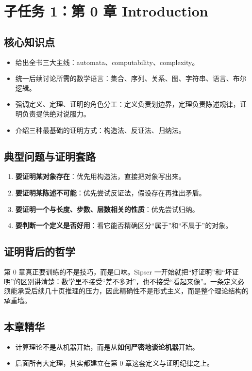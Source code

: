 \section{子任务 1：第 0 章 Introduction}

\subsection{核心知识点}

\begin{itemize}[leftmargin=2em]
  \item 给出全书三大主线：automata、computability、complexity。
  \item 统一后续讨论所需的数学语言：集合、序列、关系、图、字符串、语言、布尔逻辑。
  \item 强调定义、定理、证明的角色分工：定义负责划边界，定理负责陈述规律，证明负责提供绝对说服力。
  \item 介绍三种最基础的证明方式：构造法、反证法、归纳法。
\end{itemize}

\subsection{典型问题与证明套路}

\begin{enumerate}[leftmargin=2em]
  \item \textbf{要证明某对象存在}：优先用构造法，直接把对象写出来。
  \item \textbf{要证明某陈述不可能}：优先尝试反证法，假设存在再推出矛盾。
  \item \textbf{要证明一个与长度、步数、层数相关的性质}：优先尝试归纳。
  \item \textbf{要判断一个定义是否好用}：看它能否精确区分“属于”和“不属于”的对象。
\end{enumerate}

\subsection{证明背后的哲学}

第 0 章真正要训练的不是技巧，而是口味。Sipser 一开始就把“好证明”和“坏证明”的区别讲清楚：数学里不接受“差不多对”，也不接受“看起来像”。一条定义必须能承受后续几十页推理的压力，因此精确性不是形式主义，而是整个理论结构的承重墙。

\subsection{本章精华}

\begin{itemize}[leftmargin=2em]
  \item 计算理论不是从机器开始，而是从\textbf{如何严密地谈论机器}开始。
  \item 后面所有大定理，其实都建立在第 0 章这套定义与证明纪律之上。
\end{itemize}

\newpage
